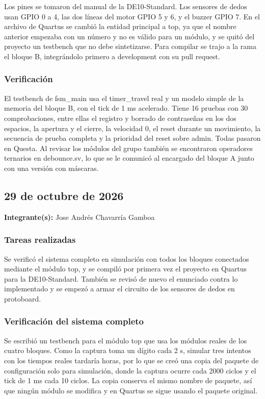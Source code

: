 \documentclass[11pt,letterpaper]{article}
\newcommand{\entrada}[2]{%
  \subsection*{#1}%
  \addcontentsline{toc}{subsection}{#1}%
  \noindent\textbf{Integrante(s):} #2\par\medskip
}
\begin{document}
Los pines se tomaron del manual de la DE10-Standard. Los sensores de dedos usan GPIO 0 a 4, las dos líneas del motor GPIO 5 y 6, y el buzzer GPIO 7. En el archivo de Quartus se cambió la entidad principal a top, ya que el nombre anterior empezaba con un número y no es válido para un módulo, y se quitó del proyecto un testbench que no debe sintetizarse. Para compilar se trajo a la rama el bloque B, integrándolo primero a development con su pull request.

\subsubsection*{Verificación}

El testbench de fsm\_main usa el timer\_travel real y un modelo simple de la memoria del bloque B, con el tick de 1 ms acelerado. Tiene 16 pruebas con 30 comprobaciones, entre ellas el registro y borrado de contraseñas en los dos espacios, la apertura y el cierre, la velocidad 0, el reset durante un movimiento, la secuencia de prueba completa y la prioridad del reset sobre admin. Todas pasaron en Questa. Al revisar los módulos del grupo también se encontraron operadores ternarios en debounce.sv, lo que se le comunicó al encargado del bloque A junto con una versión con máscaras.

\entrada{29 de octubre de 2026}{Jose Andrés Chavarría Gamboa}

\subsubsection*{Tareas realizadas}

Se verificó el sistema completo en simulación con todos los bloques conectados mediante el módulo top, y se compiló por primera vez el proyecto en Quartus para la DE10-Standard. También se revisó de nuevo el enunciado contra lo implementado y se empezó a armar el circuito de los sensores de dedos en protoboard.

\subsubsection*{Verificación del sistema completo}

Se escribió un testbench para el módulo top que usa los módulos reales de los cuatro bloques. Como la captura toma un dígito cada 2 s, simular tres intentos con los tiempos reales tardaría horas, por lo que se creó una copia del paquete de configuración solo para simulación, donde la captura ocurre cada 2000 ciclos y el tick de 1 ms cada 10 ciclos. La copia conserva el mismo nombre de paquete, así que ningún módulo se modifica y en Quartus se sigue usando el paquete original.
\end{document}
